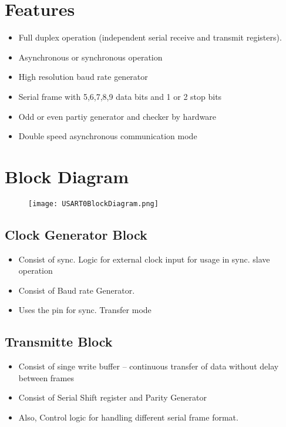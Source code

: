 



% 

\section{Features}
\begin{itemize}
    \item Full duplex operation (independent serial receive and transmit registers).
    \item Asynchronous or synchronous operation
    \item High resolution baud rate generator
    \item Serial frame with 5,6,7,8,9 data bits and 1 or 2 stop bits
    \item Odd or even partiy generator and checker by hardware
    \item Double speed asynchronous communication mode
\end{itemize}
\section{Block Diagram}
\begin{figure}[H]
    \centering
    \texttt{[image: USART0BlockDiagram.png]}
\end{figure}

\subsection{Clock Generator Block}
\begin{itemize}
    \item Consist of sync. Logic for external clock input for usage in sync. slave operation 
    \item Consist of Baud rate Generator.
    \item Uses the  pin for sync. Transfer mode
\end{itemize}

\subsection{Transmitte Block}
\begin{itemize}
    \item Consist of singe write buffer – continuous transfer of data without delay between frames
    \item Consist of Serial Shift register and Parity Generator
    \item Also, Control logic for handling different serial frame format.
\end{itemize}

